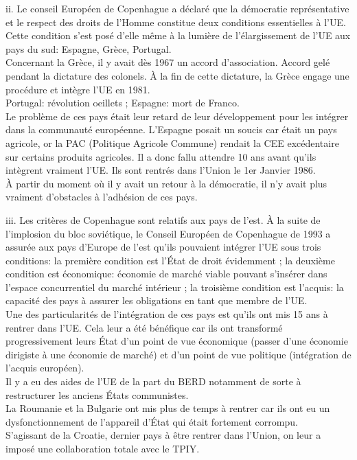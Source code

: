 \documentclass[12pt, a4paper, openany]{book}
\begin{document}
ii. Le conseil Européen de Copenhague a déclaré que la démocratie représentative et le respect des droits de l'Homme constitue deux conditions essentielles à l'UE. Cette condition s'est posé d'elle même à la lumière de l'élargissement de l'UE aux pays du sud: Espagne, Grèce, Portugal. \\
Concernant la Grèce, il y avait dès 1967 un accord d'association. Accord gelé pendant la dictature des colonels. À la fin de cette dictature, la Grèce engage une procédure et intègre l'UE en 1981. \\
Portugal: révolution oeillets ; Espagne: mort de Franco. \\
Le problème de ces pays était leur retard de leur développement pour les intégrer dans la communauté européenne. L'Espagne posait un soucis car était un pays agricole, or la PAC (Politique Agricole Commune) rendait la CEE excédentaire sur certains produits agricoles. Il a donc fallu attendre 10 ans avant qu'ils intègrent vraiment l'UE. Ils sont rentrés dans l'Union le 1er Janvier 1986. \\
À partir du moment où il y avait un retour à la démocratie, il n'y avait plus vraiment d'obstacles à l'adhésion de ces pays.


iii. Les critères de Copenhague sont relatifs aux pays de l'est. À la suite de l'implosion du bloc soviétique, le Conseil Européen de Copenhague de 1993 a assurée aux pays d'Europe de l'est qu'ils pouvaient intégrer l'UE sous trois conditions: la première condition est l'État de droit évidemment ; la deuxième condition est économique: économie de marché viable pouvant s'insérer dans l'espace concurrentiel du marché intérieur ; la troisième condition est l'acquis: la capacité des pays à assurer les obligations en tant que membre de l'UE. \\
Une des particularités de l'intégration de ces pays est qu'ils ont mis 15 ans à rentrer dans l'UE. Cela leur a été bénéfique car ils ont transformé progressivement leurs État d'un point de vue économique (passer d'une économie dirigiste à une économie de marché) et d'un point de vue politique (intégration de l'acquis européen). \\
Il y a eu des aides de l'UE de la part du BERD notamment de sorte à restructurer les anciens États communistes. \\
La Roumanie et la Bulgarie ont mis plus de temps à rentrer car ils ont eu un dysfonctionnement de l'appareil d'État qui était fortement corrompu. \\
S'agissant de la Croatie, dernier pays à être rentrer dans l'Union, on leur a imposé une collaboration totale avec le TPIY.
\end{document}
